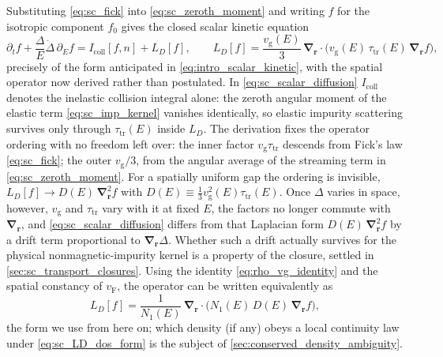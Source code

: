 \documentclass[
  aps,
  prb,
  preprint,
  superscriptaddress,
  longbibliography,
  nofootinbib
]{revtex4-2}
\newcommand{\br}{\mathbf{r}}
\newcommand{\bnabla}{\boldsymbol{\nabla}}
\newcommand{\vF}{v_{\mathrm{F}}}
\newcommand{\vg}{v_{\mathrm{g}}}
\newcommand{\tautr}{\tau_{\mathrm{tr}}}
\newcommand{\DOS}{N_1}
\newcommand{\DE}{D(E)}
\newcommand{\LD}{L_D}
\newcommand{\Icoll}{I_{\mathrm{coll}}}
\begin{document}
Substituting \cref{eq:sc_fick} into \cref{eq:sc_zeroth_moment} and writing
\(f\) for the isotropic component \(f_{0}\) gives the closed scalar kinetic
equation
\begin{equation}
  \partial_t f
  +
  \frac{\Delta}{E}\dot{\Delta}\,\partial_E f
  =
  \Icoll[f,n]
  +
  \LD[f],
  \qquad
  \LD[f]
  =
  \frac{\vg(E)}{3}\,
  \bnabla_{\br}\cdot
  \bigl(
    \vg(E)\,\tautr(E)\,
    \bnabla_{\br} f
  \bigr),
  \label{eq:sc_scalar_diffusion}
\end{equation}
precisely of the form anticipated in \cref{eq:intro_scalar_kinetic}, with
the spatial operator now derived rather than postulated. In
\cref{eq:sc_scalar_diffusion} \(\Icoll\) denotes the inelastic collision
integral alone: the zeroth angular moment of the elastic term
\cref{eq:sc_imp_kernel} vanishes identically, so elastic impurity
scattering survives only through \(\tautr(E)\) inside \(\LD\). The derivation
fixes the operator ordering with no freedom left over: the inner factor
\(\vg\tautr\) descends from Fick's law \cref{eq:sc_fick}; the outer
\(\vg/3\), from the angular average of the streaming term in
\cref{eq:sc_zeroth_moment}. For a spatially uniform gap the ordering is
invisible, \(\LD[f]\to\DE\,\bnabla_{\br}^{2}f\) with
\(\DE\equiv\tfrac{1}{3}\vg^{2}(E)\tautr(E)\). Once \(\Delta\) varies in
space, however, \(\vg\) and \(\tautr\) vary with it at fixed \(E\), the
factors no longer commute with \(\bnabla_{\br}\), and
\cref{eq:sc_scalar_diffusion} differs from that Laplacian form
\(\DE\,\bnabla_{\br}^{2}f\) by a drift term proportional to
\(\bnabla_{\br}\Delta\). Whether such a drift actually survives for
the physical nonmagnetic-impurity kernel is a property of the
closure, settled in \cref{sec:sc_transport_closures}. Using the identity \cref{eq:rho_vg_identity} and
the spatial constancy of \(\vF\), the operator can be written equivalently
as
\begin{equation}
  \LD[f]
  =
  \frac{1}{\DOS(E)}\,
  \bnabla_{\br}\cdot
  \bigl(
    \DOS(E)\,\DE\,
    \bnabla_{\br} f
  \bigr),
  \label{eq:sc_LD_dos_form}
\end{equation}
the form we use from here on; which density (if any) obeys a local
continuity law under \cref{eq:sc_LD_dos_form} is the subject of
\cref{sec:conserved_density_ambiguity}.
\end{document}
